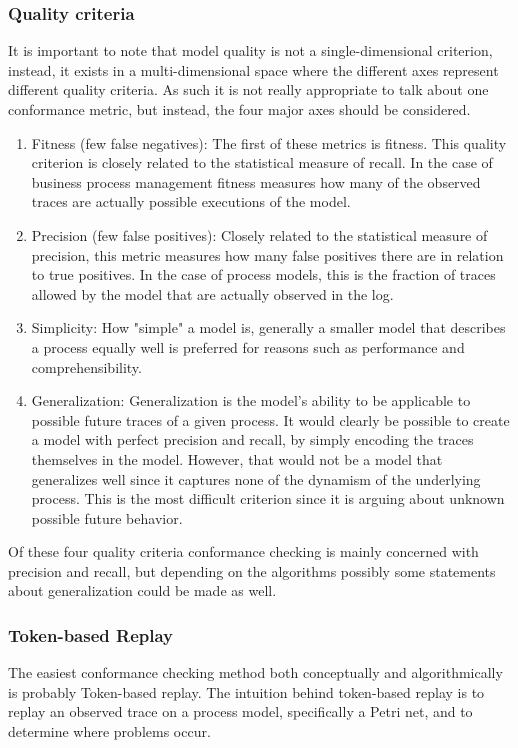 \documentclass[runningheads]{template/llncs}
\begin{document}
\subsubsection{Quality criteria}
It is important to note that model quality is not a single-dimensional criterion, instead, it exists in a multi-dimensional space where the different axes represent different quality criteria.
As such it is not really appropriate to talk about one conformance metric, but instead, the four major axes should be considered.
\begin{enumerate}
	\item Fitness (few false negatives): The first of these metrics is fitness. This quality criterion is closely related to the statistical measure of recall. In the case of business process management fitness measures how many of the observed traces are actually possible executions of the model.
	\item Precision (few false positives): Closely related to the statistical measure of precision, this metric measures how many false positives there are in relation to true positives. In the case of process models, this is the fraction of traces allowed by the model that are actually observed in the log.
	\item Simplicity: How "simple" a model is, generally a smaller model that describes a process equally well is preferred for reasons such as performance and comprehensibility.
	\item Generalization: Generalization is the model's ability to be applicable to possible future traces of a given process. 
	It would clearly be possible to create a model with perfect precision and recall, by simply encoding the traces themselves in the model. However, that would not be a model that generalizes well since it captures none of the dynamism of the underlying process. 
	This is the most difficult criterion since it is arguing about unknown possible future behavior.
\end{enumerate}

Of these four quality criteria conformance checking is mainly concerned with precision and recall, but depending on the algorithms possibly some statements about generalization could be made as well. 

\subsubsection{Token-based Replay}

The easiest conformance checking method both conceptually and algorithmically is probably Token-based replay.
The intuition behind token-based replay is to replay an observed trace on a process model, specifically a Petri net, and to determine where problems occur.
\end{document}

